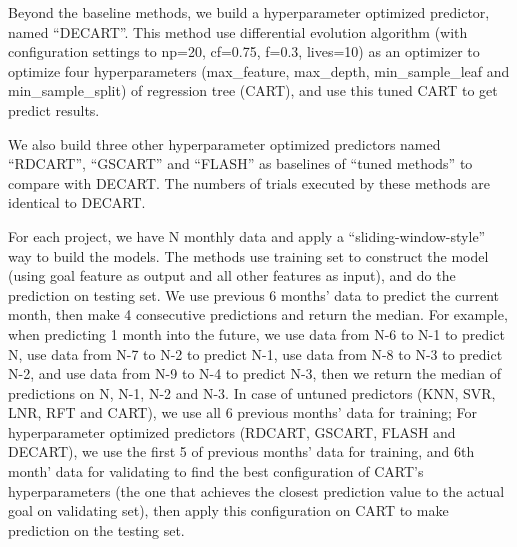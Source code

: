 \documentclass[smallextended]{svjour3}
\newcommand{\respto}[1]{
\fcolorbox{black}{black!15}{%
\label{resp:#1}%
\bf\scriptsize R{#1}}}
\newcommand{\BLUE}{\color{blue}}
\begin{document}
Beyond the baseline methods, we build a hyperparameter optimized predictor, named ``DECART''. This method use differential evolution algorithm (with configuration settings to {np=20, cf=0.75, f=0.3, lives=10}) as an optimizer to optimize four hyperparameters (max\_feature, max\_depth, min\_sample\_leaf and min\_sample\_split) of regression tree (CART), and use this tuned CART to get predict results. 

\BLUE
We also build three other hyperparameter optimized predictors named ``RDCART'', ``GSCART'' and ``FLASH'' as baselines of ``tuned methods'' to compare with DECART. The numbers of trials executed by these methods are identical to DECART.


\respto{4C} \respto{4E1}
For each project, we have N monthly data and apply a ``sliding-window-style'' way to build the models. The methods use training set to construct the model (using goal feature as output and all other features as input), and do the prediction on testing set. We use previous 6 months' data to predict the current month, then make 4 consecutive predictions and return the median. For example, when predicting 1 month into the future, we use data from N-6 to N-1 to predict N, use data from N-7 to N-2 to predict N-1, use data from N-8 to N-3 to predict N-2, and use data from N-9 to N-4 to predict N-3, then we return the median of predictions on N, N-1, N-2 and N-3. In case of untuned predictors (KNN, SVR, LNR, RFT and CART), we use all 6 previous months' data for training; For hyperparameter optimized predictors (RDCART, GSCART, FLASH and DECART), we use the first 5 of previous months' data for training, and 6th month' data for validating to find the best configuration of CART's hyperparameters (the one that achieves the closest prediction value to the actual goal on validating set), then apply this configuration on CART to make prediction on the testing set.  
\end{document}
